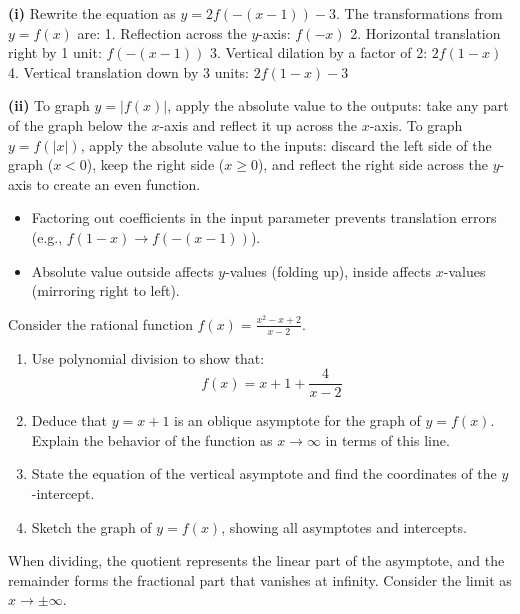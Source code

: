 \begin{solution}
\textbf{(i)} Rewrite the equation as $y = 2f(-(x-1)) - 3$. The transformations from $y=f(x)$ are:
1. Reflection across the $y$-axis: $f(-x)$
2. Horizontal translation right by 1 unit: $f(-(x-1))$
3. Vertical dilation by a factor of 2: $2f(1-x)$
4. Vertical translation down by 3 units: $2f(1-x) - 3$

\textbf{(ii)} 
To graph $y=|f(x)|$, apply the absolute value to the outputs: take any part of the graph below the $x$-axis and reflect it up across the $x$-axis.
To graph $y=f(|x|)$, apply the absolute value to the inputs: discard the left side of the graph ($x < 0$), keep the right side ($x \ge 0$), and reflect the right side across the $y$-axis to create an even function.
\end{solution}

\begin{takeaways}
\begin{itemize}[leftmargin=*]
\item Factoring out coefficients in the input parameter prevents translation errors (e.g., $f(1-x) \to f(-(x-1))$).
\item Absolute value outside affects $y$-values (folding up), inside affects $x$-values (mirroring right to left).
\end{itemize}
\end{takeaways}


\begin{problem}
Consider the rational function $f(x) = \frac{x^2 - x + 2}{x - 2}$.
\begin{enumerate}[label=(\roman*)]
\item Use polynomial division to show that:
\[ f(x) = x + 1 + \frac{4}{x - 2} \]
\item Deduce that $y = x + 1$ is an oblique asymptote for the graph of $y = f(x)$. Explain the behavior of the function as $x \to \infty$ in terms of this line.
\item State the equation of the vertical asymptote and find the coordinates of the $y$-intercept.
\item Sketch the graph of $y = f(x)$, showing all asymptotes and intercepts.
\end{enumerate}
\end{problem}

\begin{hint}
When dividing, the quotient represents the linear part of the asymptote, and the remainder forms the fractional part that vanishes at infinity. Consider the limit as $x \to \pm\infty$.
\end{hint}

